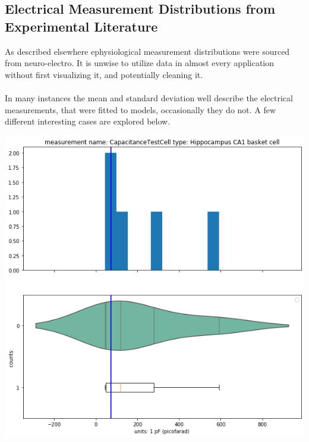 \subsection{Electrical Measurement Distributions from Experimental Literature}%
As described elsewhere ephysiological measurement distributions were sourced from neuro-electro. It is unwise to utilize data in almost every application without first visualizing it, and potentially cleaning it.\\
\\
In many instances the mean and standard deviation well describe the electrical measurements, that were fitted to models, occasionally they do not. A few different interesting cases are explored below.



    


    \begin{center}
    \includegraphics[width=0.7\linewidth]{notebooks_converted/needata_thesis_files/needata_thesis_5_4}
    \end{center}


